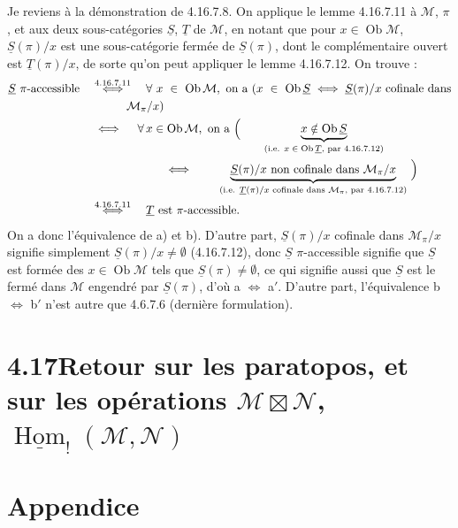 \documentclass[11pt]{article}
\newcommand{\printedpage}[1]{\marginpar{\footnotesize p.~#1}}
\newcommand{\msp}[1]{\marginpar{\footnotesize [#1]}}
\newcommand{\cM}{\mathcal{M}}
\newcommand{\Ob}{\operatorname{Ob}}
\newcommand{\cN}{\mathcal{N}}
\begin{document}
\noindent Je reviens à la démonstration de 4.16.7.8. On applique le lemme 4.16.7.11 à $\cM$, $\pi$, et aux deux
\msp{page 491}
sous-catégories $\underline{S}$, $\underline{T}$ de $\cM$, en notant que pour $x\in\Ob\cM$, $\underline{S}(\pi)/x$ est une sous-catégorie fermée de $\underline{S}(\pi)$, dont le complémentaire ouvert est $\underline{T}(\pi)/x$, de sorte qu'on peut appliquer le lemme 4.16.7.12. On trouve :
\[
\begin{aligned}
\underline{S}\ \pi\text{-accessible} \quad &\overset{4.16.7.11}{\iff} \quad \forall\ x\ \in\ \Ob\cM,\ \text{on a } (x\ \in\ \Ob\underline{S}\iff\underline{S}(\pi)/x \text{ cofinale dans}\\
&\qquad\quad \cM_\pi/x)\\
&\iff \quad \forall\, x\in\Ob\cM,\ \text{on a } \Bigl( \qquad \underbrace{x\notin\Ob\underline{S}}_{\text{(i.e. $x\in\Ob\underline{T}$, par 4.16.7.12)}}\\
&\qquad\qquad\qquad \iff \qquad \underbrace{\underline{S}(\pi)/x \text{ non cofinale dans } \cM_\pi/x}_{\text{(i.e. $\underline{T}(\pi)/x$ cofinale dans $\cM_\pi$, par 4.16.7.12)}} \ \Bigr)\\
&\overset{4.16.7.11}{\iff} \quad \underline{T} \text{ est } \pi\text{-accessible.}
\end{aligned}
\]
On a donc l'équivalence de a) et b). D'autre part, $\underline{S}(\pi)/x$ cofinale dans $\cM_\pi/x$ signifie simplement $\underline{S}(\pi)/x\neq\emptyset$ (4.16.7.12), donc $\underline{S}$ $\pi$-accessible signifie que $\underline{S}$ est formée des $x\in\Ob\cM$ tels que $\underline{S}(\pi)\neq\emptyset$, ce qui signifie aussi que $\underline{S}$ est le fermé dans $\cM$ engendré par $\underline{S}(\pi)$, d'où a $\iff$ a$'$. D'autre part, l'équivalence b $\iff$ b$'$ n'est autre que 4.6.7.6 (dernière formulation). %

\msp{page 492}

\section*{4.17\quad Retour sur les paratopos, et sur les opérations $\cM\boxtimes\cN$, $\underline{\operatorname{Hom}}_{!}(\cM,\cN)$}

\noindent

\printedpage{191}

\msp{page 1}

\section*{Appendice}
\end{document}
